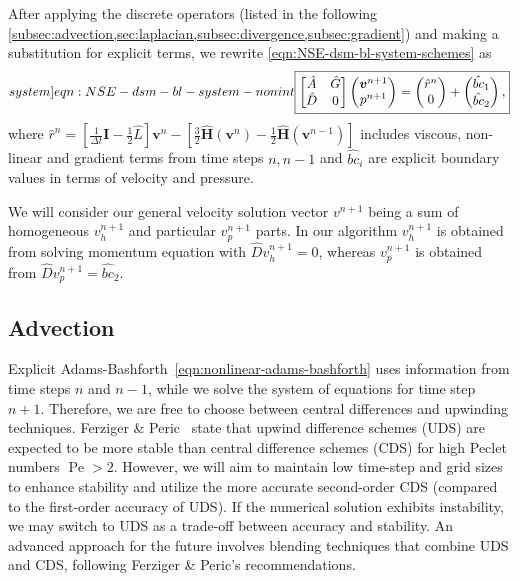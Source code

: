 \documentclass{article}
\numberwithin{equation}{section}
\begin{document}
After applying the discrete operators (listed in the following \cref{subsec:advection,sec:laplacian,subsec:divergence,subsec:gradient}) and making a substitution for explicit terms, we rewrite \cref{eqn:NSE-dsm-bl-system-schemes}  as
\begin{equation}\label[system]{eqn:NSE-dsm-bl-system-nonint}
	\boxed{\begin{bmatrix}
		\hat{A} & \hat{G} \\
		\hat{D} & 0
	\end{bmatrix}
	\begin{pmatrix}
		\boldsymbol{v}^{n+1} \\ 
		p^{n+1}
	\end{pmatrix}
	=
	\begin{pmatrix}
		\hat{r}^n \\
		0
	\end{pmatrix}
	+
	\begin{pmatrix}
		\hat{bc}_1\\
		\hat{bc}_2
	\end{pmatrix},}
\end{equation}
where $\hat{r}^n=\left[\frac{1}{\Delta t}\mathbf{I}-\frac{1}{2}\hat{L}\right] \boldsymbol{v}^n - \left[\frac{3}{2}\hat{\mathbf{H}}(\boldsymbol{v}^n) - \frac{1}{2}\hat{\mathbf{H}}(\boldsymbol{v}^{n-1})\right]$ includes viscous, non-linear and gradient terms from time steps $n,n-1$ and $\hat{bc}_i$ are explicit boundary values in terms of velocity and pressure.

We will consider our general velocity solution vector $v^{n+1}$ being a sum of homogeneous $v^{n+1}_h$ and particular $v^{n+1}_p$ parts. In our algorithm \cite{Hall:1980,Colonius:2007,Chang:2002} $v^{n+1}_h$ is obtained from solving momentum equation with $\hat{D} v^{n+1}_h=0$, whereas $v^{n+1}_p$ is obtained from $\hat{D} v^{n+1}_p=\hat{bc}_2$.




\subsection{Advection}\label{subsec:advection}

Explicit Adams-Bashforth~\cref{eqn:nonlinear-adams-bashforth} uses information from time steps $n$ and $n-1$, while we solve the system of equations for time step $n+1$. Therefore, we are free to choose between central differences and upwinding techniques. 
Ferziger \& Peric~\cite{Ferziger:2002} state that upwind difference schemes (UDS) are expected to be more stable than central difference schemes (CDS) for high Peclet numbers $\operatorname{Pe}>2$. However, we will aim to maintain low time-step and grid sizes to enhance stability and utilize the more accurate second-order CDS (compared to the first-order accuracy of UDS). If the numerical solution exhibits instability, we may switch to UDS as a trade-off between accuracy and stability. An advanced approach for the future involves blending techniques that combine UDS and CDS, following Ferziger \& Peric’s recommendations.
\end{document}
